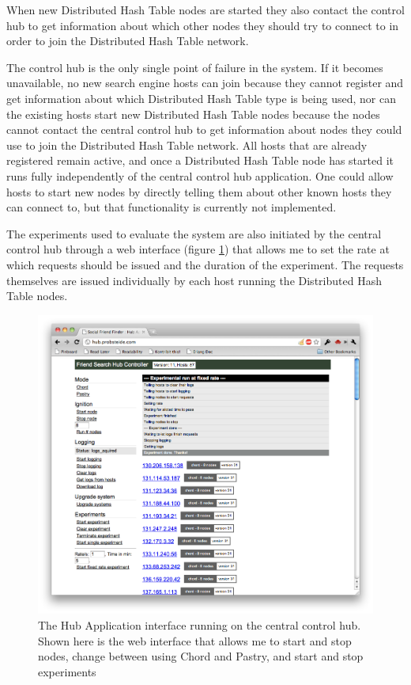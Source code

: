 When new Distributed Hash Table nodes are started they also contact the control hub to get information about which other nodes they should try to connect to in order to join the Distributed Hash Table network.

The control hub is the only single point of failure in the system. If it becomes unavailable, no new search engine hosts can join because they cannot register and get information about which Distributed Hash Table type is being used, nor can the existing hosts start new Distributed Hash Table nodes because the nodes cannot contact the central control hub to get information about nodes they could use to join the Distributed Hash Table network. All hosts that are already registered remain active, and once a Distributed Hash Table node has started it runs fully independently of the central control hub application.
One could allow hosts to start new nodes by directly telling them about other known hosts they can connect to, but that functionality is currently not implemented.

The experiments used to evaluate the system are also initiated by the central control hub through a web interface (figure \ref{figHubApp}) that allows me to set the rate at which requests should be issued and the duration of the experiment. The requests themselves are issued individually by each host running the Distributed Hash Table nodes.

\begin{figure}[!htb]
\begin{center}
	\includegraphics[width=0.9\linewidth]{illustrations/HubApp.png}
\caption{The Hub Application interface running on the central control hub. Shown here is the web interface that allows me to start and stop nodes, change between using Chord and Pastry, and start and stop experiments}
\label{figHubApp}
\end{center}
\end{figure}

